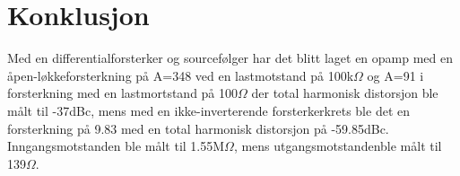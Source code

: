 \section{Konklusjon}
\label{sec:conclusion}

Med en differentialforsterker og sourcefølger har det blitt laget en opamp med en åpen-løkkeforsterkning på A=348 ved en lastmotstand på 100k$\Omega$ og A=91 i forsterkning med en lastmortstand på 100$\Omega$ der total harmonisk distorsjon ble målt til -37dBc, mens med en ikke-inverterende forsterkerkrets ble det en forsterkning på 9.83 med en total harmonisk distorsjon på -59.85dBc. Inngangsmotstanden ble målt til 1.55M$\Omega$, mens utgangsmotstandenble målt til 139$\Omega$.